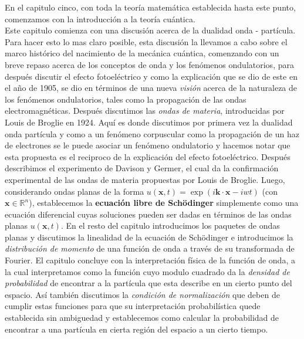 \documentclass[12pt]{book}
\numberwithin{equation}{chapter}
\def\R{\mathbb{R}}
\def\x{\mathbf{x}}
\def\k{\mathbf{k}}
\begin{document}
En el capitulo cinco, con toda la teor\'ia matem\'atica establecida hasta este punto, comenzamos con la introducci\'on a la teor\'ia cu\'antica.\\
Este capitulo comienza con una discusi\'on acerca de la dualidad onda - part\'icula. Para hacer esto lo mas claro posible, esta discusi\'on la llevamos a cabo sobre el marco hist\'orico del nacimiento de la mec\'anica cu\'antica, comenzando con un breve repaso acerca de los conceptos de onda y los fen\'omenos ondulatorios, para despu\'es discutir el efecto fotoel\'ectrico y como la explicaci\'on que se dio de este en el a\~no de 1905, se dio en t\'erminos de una nueva \emph{visi\'on} acerca de la naturaleza de los fen\'omenos ondulatorios, tales como la propagaci\'on de las ondas electromagn\'eticas. Despu\'es discutimos las \emph{ondas de materia}, introducidas por Louis de Broglie en 1924. Aqu\'i es donde discutimos por primera vez la dualidad onda part\'icula y como a un fen\'omeno corpuscular como la propagaci\'on de un haz de electrones se le puede asociar un fen\'omeno ondulatorio y hacemos notar que esta propuesta es el reciproco de la explicaci\'on del efecto fotoel\'ectrico. Despu\'es describimos el experimento de Davison y Germer, el cual da la confirmaci\'on experimental de las ondas de materia propuestas por Louis de Broglie. Luego, considerando ondas planas de la forma $u(\x,t)= \exp ( i \k \cdot \x - iwt )$ (con $\x \in \R^{n}$), establecemos la {\bf ecuaci\'on libre de Sch\"odinger} simplemente como una ecuaci\'on diferencial cuyas soluciones pueden ser dadas en t\'erminos de las ondas planas $u(\x,t)$. En el resto del capitulo introducimos los paquetes de ondas planas y discutimos la linealidad de la ecuaci\'on de Sch\"odinger e introducimos la \emph{distribuci\'on de momento} de una funci\'on de onda a trav\'es de su transformada de Fourier. El capitulo concluye con la interpretaci\'on f\'isica de la funci\'on de onda, a la cual interpretamos como la funci\'on cuyo modulo cuadrado da la \emph{densidad de probabilidad} de encontrar a la part\'icula que esta describe en un cierto punto del espacio. As\'i tambi\'en discutimos la \emph{condici\'on de normalizaci\'on} que deben de cumplir estas funciones para que su interpretaci\'on probabil\'istica quede establecida sin ambiguedad y establecemos como calcular la probabilidad de encontrar a una part\'icula en cierta regi\'on del espacio a un cierto tiempo.\\
\end{document}
